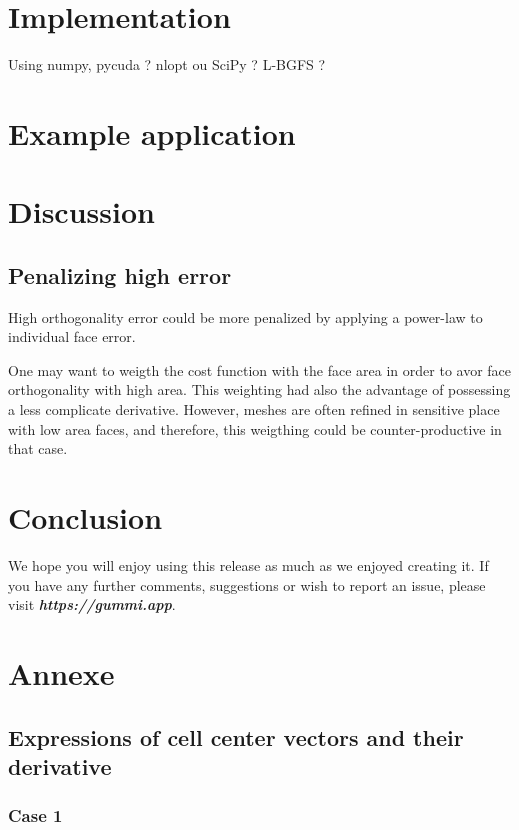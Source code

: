 \documentclass[11pt]{article}
\begin{document}
\section{Implementation}

Using numpy, pycuda ? nlopt ou SciPy ? L-BGFS ?


\section{Example application}



\section{Discussion}

\subsection{Penalizing high error}
High orthogonality error could be more penalized by applying a power-law to individual face error. 

One may want to weigth the cost function with the face area in order to avor face orthogonality with high area. 
This weighting had also the advantage of possessing a less complicate derivative. 
However, meshes are often refined in sensitive place with low area faces, and therefore, this weigthing could be counter-productive in that case.

\section{Conclusion}

We hope you will enjoy using this release as much as we enjoyed creating it. If you have any further comments, suggestions or wish to report an issue, please visit \emph{\textbf{https://gummi.app}}. 




\section{Annexe}

\subsection{Expressions of cell center vectors and their derivative}
\subsubsection{Case 1}
\end{document}
